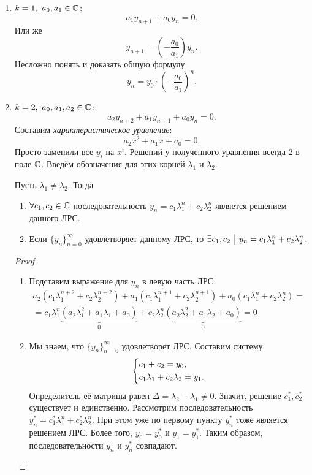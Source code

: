 \begin{enumerate}
	\item $k = 1,\ a_0, a_1 \in \mathbb{C}$:
	\[
		a_1y_{n + 1} + a_0y_n = 0.
	\]
	Или же
	\[
		y_{n + 1} = \left(-\frac{a_0}{a_1}\right)y_n.
	\]
	Несложно понять и доказать общую формулу:
	\[
		y_{n} = y_0 \cdot \left(-\frac{a_0}{a_1}\right)^n.
	\]
	
	\item $k = 2,\ a_0, a_1, a_2 \in \mathbb{C}$:
	\[
		a_2y_{n + 2} + a_1y_{n + 1} + a_0y_n = 0.
	\]
	Составим \textit{характеристическое уравнение}:
	\[
		a_2x^2 + a_1x + a_0 = 0.
	\]
	Просто заменили все $y_i$ на $x^i$. Решений у полученного уравнения всегда 2 в поле $\mathbb{C}$. Введём обозначения для этих корней $\lambda_1$ и $\lambda_2$.
	\begin{theorem}
		Пусть $\lambda_1 \neq \lambda_2$. Тогда
		\begin{enumerate}
			\item $\forall c_1, c_2 \in \mathbb{C}$ последовательность $y_n = c_1\lambda_1^n + c_2\lambda_2^n$ является решением данного ЛРС.
			\item Если $\{y_n\}_{n = 0}^\infty$ удовлетворяет данному ЛРС, то $\exists c_1, c_2 \ \big|\  y_n = c_1\lambda_1^n + c_2\lambda_2^n$.
		\end{enumerate}
	\end{theorem}

	\begin{proof}~
		\begin{enumerate}
			\item Подставим выражение для $y_n$ в левую часть ЛРС:
			\begin{multline*}
				a_2(c_1\lambda_1^{n + 2} + c_2\lambda_2^{n + 2}) + a_1(c_1\lambda_1^{n + 1} + c_2\lambda_2^{n + 1}) + a_0(c_1\lambda_1^n + c_2\lambda_2^n) =
				\\ =
				c_1\lambda_1^n\underbrace{(a_2\lambda_1^2 + a_1\lambda_1 + a_0)}_{0} + c_2\lambda_2^n\underbrace{(a_2\lambda_2^2 + a_1\lambda_2 + a_0)}_{0} = 0
			\end{multline*}
			
			\item Мы знаем, что $\{y_n\}_{n = 0}^\infty$ удовлетворет ЛРС. Составим систему
			\[
				\left\{\begin{aligned}
					&{c_1 + c_2 = y_0,}
					\\
					&{c_1\lambda_1 + c_2\lambda_2 = y_1.}
				\end{aligned}\right.
			\]
			Определитель её матрицы равен $\Delta = \lambda_2 - \lambda_1 \neq 0$. Значит, решение $c_1^*, c_2^*$ существует и единственно. Рассмотрим последовательность $y_n^* = c_1^*\lambda_1^n + c_2^*\lambda_2^n$. При этом уже по первому пункту $y_n^*$ тоже является решением ЛРС. Более того, $y_0 = y_0^*$ и $y_1 = y_1^*$. Таким образом, последовательности $y_n$ и $y_n^*$ совпадают.
		\end{enumerate}
	\end{proof}


\end{enumerate}
